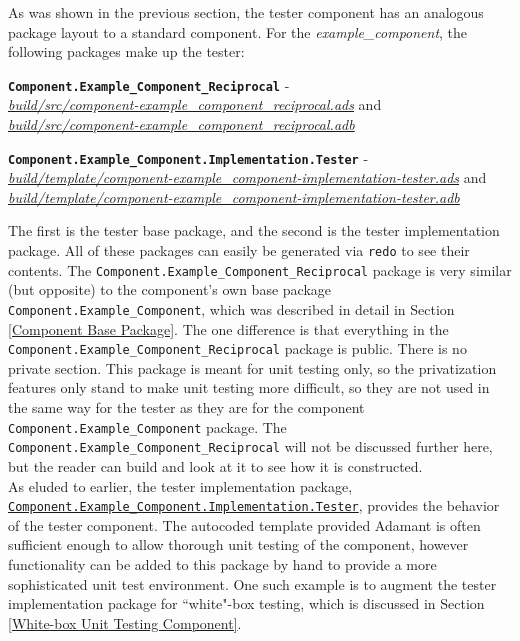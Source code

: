 As was shown in the previous section, the tester component has an analogous package layout to a standard component. For the \textit{example\_component}, the following packages make up the tester:

\vspace{5mm} %
\begin{spaceditemize}
  \item \textbf{\texttt{Component.Example\_Component\_Reciprocal}} - \\ \textit{\url{build/src/component-example\_component\_reciprocal.ads}} and \\ \textit{\url{build/src/component-example\_component\_reciprocal.adb}}
  \item \textbf{\texttt{Component.Example\_Component.Implementation.Tester}} - \\ \textit{\url{build/template/component-example\_component-implementation-tester.ads}} and \\ \textit{\url{build/template/component-example\_component-implementation-tester.adb}}
\end{spaceditemize}
\vspace{5mm} %

The first is the tester base package, and the second is the tester implementation package. All of these packages can easily be generated via \texttt{redo} to see their contents. The \texttt{Component.Example\_Component\_Reciprocal} package is very similar (but opposite) to the component's own base package \texttt{Component.Example\_Component}, which was described in detail in Section \ref{Component Base Package}. The one difference is that everything in the \texttt{Component.Example\_Component\_Reciprocal} package is public. There is no private section. This package is meant for unit testing only, so the privatization features only stand to make unit testing more difficult, so they are not used in the same way for the tester as they are for the component \texttt{Component.Example\_Component} package. The \texttt{Component.Example\_Component\_Reciprocal} will not be discussed further here, but the reader can build and look at it to see how it is constructed. \\

As eluded to earlier, the tester implementation package, \texttt{\url{Component.Example\_Component.Implementation.Tester}}, provides the behavior of the tester component. The autocoded template provided Adamant is often sufficient enough to allow thorough unit testing of the component, however functionality can be added to this package by hand to provide a more sophisticated unit test environment. One such example is to augment the tester implementation package for ``white"-box testing, which is discussed in Section \ref{White-box Unit Testing Component}. \\

